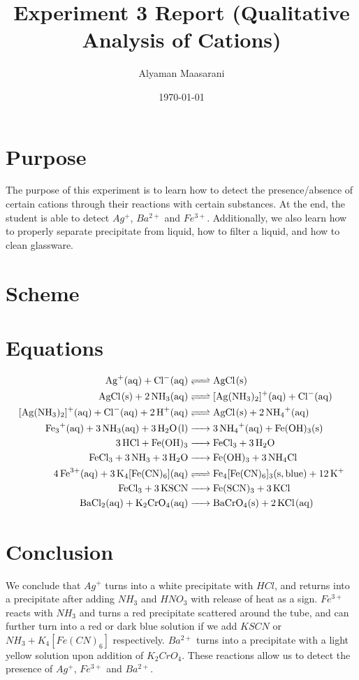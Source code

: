 \documentclass[11pt]{article}
\author{Alyaman Maasarani}
\date{\today}
\title{Experiment 3 Report (Qualitative Analysis of Cations)}
\begin{document}
\maketitle
\tableofcontents


\section{Purpose}
\label{sec:org33dd161}
The purpose of this experiment is to learn how to detect the presence/absence of certain cations through their reactions with certain substances. At the end, the student is able to detect \(Ag^{+}\), \(Ba^{2+}\) and \(Fe^{3+}\). Additionally, we also learn how to properly separate precipitate from liquid, how to filter a liquid, and how to clean glassware.

\section{Scheme}
\label{sec:org9afc1ef}
\begin{center}
  \makebox[0pt]{\scalebox{0.8}{}}
\end{center}


\section{Equations}
\begin{align}
  \ce{Ag^{+}(aq) + Cl^{-}(aq) &<=> AgCl(s)} \\
  \ce{AgCl(s) + 2NH3(aq) &<=> [Ag(NH3)2]^{+}(aq) + Cl-(aq)}\\
  \ce{[Ag(NH3)2]+(aq) + Cl^{-}(aq) + 2H^{+}(aq) &<=> AgCl(s) + 2NH4^{+}(aq) }\\
  \ce{ Fe3+(aq) + 3NH3(aq) + 3H2O(l) &-> 3NH4+(aq) + Fe(OH)3(s) } \\
  \ce{3HCl + Fe(OH)3 &-> FeCl3 + 3 H2O}\\
  \ce{FeCl3 + 3NH3 + 3H2O &-> Fe(OH)3 + 3NH4Cl}\\
  \ce{4Fe^{3+}(aq) + 3K4[Fe(CN)6](aq) &<=> Fe4[Fe(CN)6]3(s, blue) + 12K+}\\
  \ce{FeCl3 + 3KSCN &-> Fe(SCN)3 + 3KCl}\\
  \ce{BaCl2(aq) + K2CrO4(aq) &-> BaCrO4(s) + 2KCl(aq)}
\end{align}

\section{Conclusion}
\label{sec:orgf90cc25}
We conclude that \(Ag^+\) turns into a white precipitate with \(HCl\), and returns into a precipitate after adding \(NH_3\) and \(HNO_3\) with release of heat as a sign. \(Fe^{3+}\) reacts with \(NH_3\) and turns a red precipitate scattered around the tube, and can further turn into a red or dark blue solution if we add \(KSCN\) or \(NH_3 + K_4[Fe(CN)_6]\) respectively. \(Ba^{2+}\) turns into a precipitate with a light yellow solution upon addition of \(K_2CrO_4\). These reactions allow us to detect the presence of \(Ag^+\), \(Fe^{3+}\) and \(Ba^{2+}\).
\end{document}
